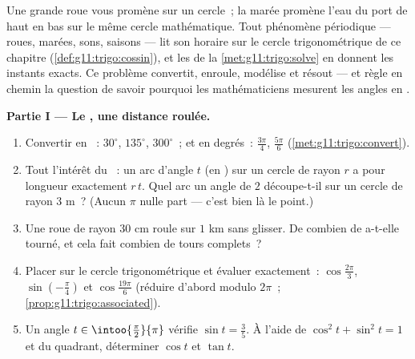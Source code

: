 \begin{problem}
\label{pb:g11:trigo:1}
Une grande roue vous promène sur un cercle~; la marée promène l'eau
du port de haut en bas sur le même cercle mathématique. Tout
phénomène périodique --- roues, marées, sons, saisons --- lit son
horaire sur le cercle trigonométrique de ce chapitre
(\cref{def:g11:trigo:cossin}), et les  de la
\cref{met:g11:trigo:solve} en donnent les instants exacts. Ce
problème convertit, enroule, modélise et résout --- et règle en
chemin la question de savoir pourquoi les mathématiciens mesurent
les angles en .

\medskip
\noindent\textbf{Partie I --- Le , une distance roulée.}
\begin{enumerate}
  \item Convertir en ~: $30^\circ$, $135^\circ$,
        $300^\circ$~; et en degrés~: $\frac{3\pi}{4}$,
        $\frac{5\pi}{6}$ (\cref{met:g11:trigo:convert}).
  \item Tout l'intérêt du ~: un arc d'angle $t$ (en )
        sur un cercle de rayon $r$ a pour longueur exactement
        $r\,t$. Quel arc un angle de $2$  découpe-t-il sur un
        cercle de rayon $3$ m~? (Aucun $\pi$ nulle part --- c'est
        bien là le point.)
  \item Une roue de rayon $30$ cm roule sur $1$ km sans glisser. De
        combien de \emph{} a-t-elle tourné, et cela fait
        combien de tours complets~?
  \item Placer sur le cercle trigonométrique et évaluer
        exactement~: $\cos\frac{2\pi}{3}$,
        $\sin\left(-\frac{\pi}{4}\right)$ et $\cos\frac{19\pi}{6}$
        (réduire d'abord modulo $2\pi$~;
        \cref{prop:g11:trigo:associated}).
  \item Un angle $t \in \intoo{\frac\pi2}{\pi}$ vérifie
        $\sin t = \frac35$. À l'aide de
        $\cos^2 t + \sin^2 t = 1$ et du quadrant, déterminer
        $\cos t$ et $\tan t$.
\end{enumerate}


\end{problem}
